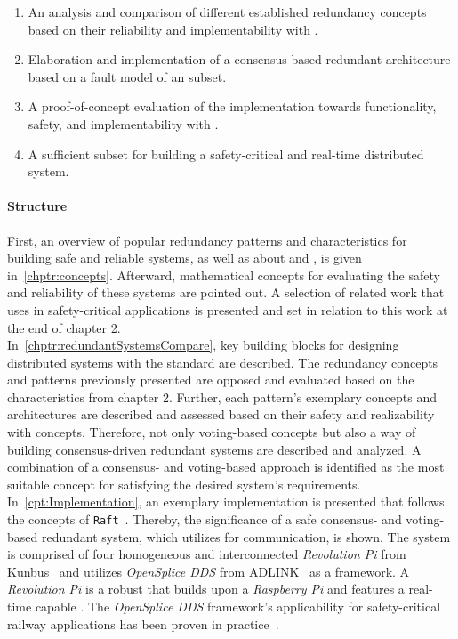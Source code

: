 \begin{enumerate}
\item An analysis and comparison of different established redundancy concepts based on their reliability and implementability with .
\item Elaboration and implementation of a consensus-based redundant architecture based on a fault model of an  subset.
\item A proof-of-concept evaluation of the implementation towards functionality, safety, and implementability with .
\item A sufficient  subset for building a safety-critical and real-time distributed system.
\end{enumerate}

\paragraph{Structure}
First, an overview of popular redundancy patterns and characteristics for building safe and reliable systems, as well as about  and , is given in~\autoref{chptr:concepts}.
Afterward, mathematical concepts for evaluating the safety and reliability of these systems are pointed out.
A selection of related work that uses  in safety-critical applications is presented and set in relation to this work at the end of chapter 2.
\\

\noindent 
In~\autoref{chptr:redundantSystemsCompare}, key building blocks for designing distributed systems with the  standard are described.
The redundancy concepts and patterns previously presented are opposed and evaluated based on the characteristics from chapter 2.
Further, each pattern's exemplary concepts and architectures are described and assessed based on their safety and realizability with  concepts.
Therefore, not only voting-based concepts but also a way of building consensus-driven redundant systems are described and analyzed.
A combination of a consensus- and voting-based approach is identified as the most suitable concept for satisfying the desired system's requirements.
\\

\noindent 
In~\autoref{cpt:Implementation}, an exemplary implementation is presented that follows the concepts of \texttt{Raft}~\cite{RaftConsensusPaper}.
Thereby, the significance of a safe consensus- and voting-based redundant system, which utilizes  for communication, is shown.
The system is comprised of four homogeneous and interconnected \textit{Revolution Pi} from Kunbus~\cite{Kunbus} and utilizes \textit{OpenSplice DDS} from ADLINK~\cite{VortexOpenSplice} as a  framework.
A \textit{Revolution Pi} is a robust  that builds upon a \textit{Raspberry Pi} and features a real-time capable .
The \textit{OpenSplice DDS} framework's applicability for safety-critical railway applications has been proven in practice~\cite{SchmidtMissionCriticalChallenges}.
\\

